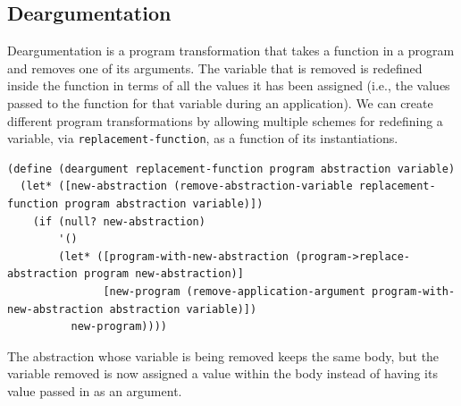 \documentclass[a4paper,10pt]{article}
\begin{document}
\subsection{Deargumentation}
Deargumentation is a program transformation that takes a function in a program and removes one of its arguments.  The variable that is removed is redefined inside the function in terms of all the values it has been assigned (i.e., the values passed to the function for that variable during an application).  We can create different program transformations by allowing multiple schemes for redefining a variable, via \texttt{replacement-function},  as a function of its instantiations.  
\begin{lstlisting}[frame=trBL]
(define (deargument replacement-function program abstraction variable)
  (let* ([new-abstraction (remove-abstraction-variable replacement-function program abstraction variable)])
    (if (null? new-abstraction)
        '()
        (let* ([program-with-new-abstraction (program->replace-abstraction program new-abstraction)]
               [new-program (remove-application-argument program-with-new-abstraction abstraction variable)])
          new-program))))
\end{lstlisting}
The abstraction whose variable is being removed keeps the same body, but the variable removed is now assigned a value  within the body instead of having its value passed in as an argument.
\end{document}
